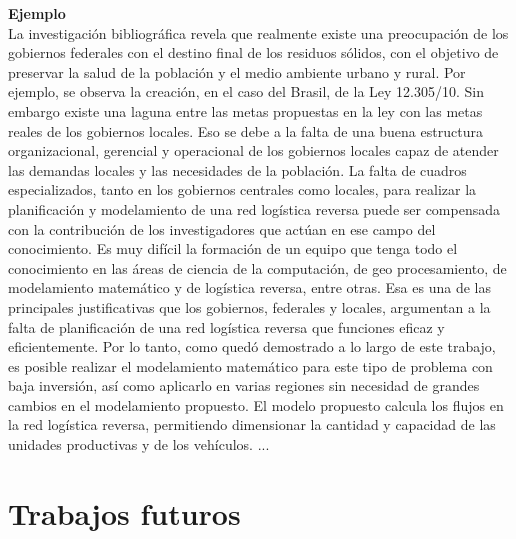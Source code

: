 {\bf Ejemplo}\\
La investigación bibliográfica revela que realmente existe una preocupación de los gobiernos federales con el destino final de los residuos sólidos, con el objetivo de preservar la salud de la población y el medio ambiente urbano y rural. Por ejemplo, se observa la creación, en el caso del Brasil, de la Ley 12.305/10. Sin embargo existe una laguna entre las metas propuestas en la ley con las metas reales de los gobiernos locales. Eso se debe a la falta de una buena estructura organizacional, gerencial y operacional de los gobiernos locales capaz de atender las demandas locales y las necesidades de la población.
\vskip 0.3cm
La falta de cuadros especializados, tanto en los gobiernos centrales como locales, para realizar la planificación y modelamiento de una red logística reversa puede ser compensada con la contribución de los investigadores que actúan en ese campo del conocimiento. Es muy difícil la formación de un equipo que tenga todo el conocimiento en las áreas de ciencia de la computación, de geo procesamiento, de modelamiento matemático y de logística reversa, entre otras. Esa es una de las principales justificativas que los gobiernos, federales y locales, argumentan a la falta de planificación de una red logística reversa que funciones eficaz y eficientemente. 
\vskip 0.3cm
Por lo tanto, como quedó demostrado a lo largo de este trabajo, es posible realizar el modelamiento matemático para este tipo de problema con baja inversión, así como aplicarlo en varias regiones sin necesidad de grandes cambios en el modelamiento propuesto. El modelo propuesto calcula los flujos en la red logística reversa, permitiendo dimensionar la cantidad y capacidad de las unidades productivas y de los vehículos. 
\vskip 0.3cm
...


\section{Trabajos futuros}



